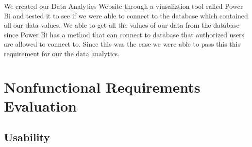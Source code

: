 \documentclass[12pt, titlepage]{article}
\begin{document}
We created our Data Analytics Website through a viusaliztion tool called Power Bi and
tested it to see if we were able to connect to the database which contained all our data
values. We able to get all the values of our data from the database since Power Bi has a
method that can connect to database that authorized users are allowed to connect to. Since
this was the case we were able to pass this this requirement for our the data analytics. \\

\section{Nonfunctional Requirements Evaluation}
\subsection{Usability}
\newpage
\end{document}
